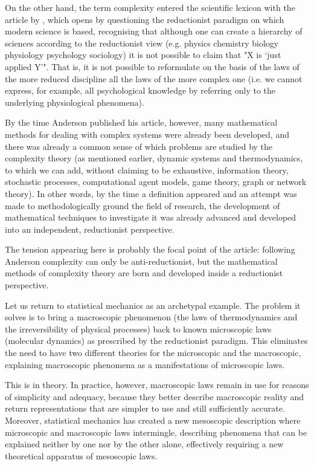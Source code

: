 \documentclass[a4paper, headings=standardclasses]{scrartcl}
\begin{document}
On the other hand, the term complexity entered the scientific lexicon with the \citeyear{anderson1972} article by \citeauthor{anderson1972}, which opens by questioning the reductionist paradigm on which modern science is based, recognising that although one can create a hierarchy of sciences according to the reductionist view (e.g. physics \textrightarrow{} chemistry \textrightarrow{} biology \textrightarrow{} physiology \textrightarrow{} psychology \textrightarrow{} sociology) it is not possible to claim that "X is `just applied Y'".
That is, it is not possible to reformulate on the basis of the laws of the more reduced discipline all the laws of the more complex one (i.e. we cannot express, for example, all psychological knowledge by referring only to the underlying physiological phenomena).

By the time Anderson published his article, however, many mathematical methods for dealing with complex systems were already been developed, and there was already a common sense of which problems are studied by the complexity theory (as mentioned earlier, dynamic systems and thermodynamics, to which we can add, without claiming to be exhaustive, information theory, stochastic processes, computational agent models, game theory, graph or network theory).
In other words, by the time a definition appeared and an attempt was made to methodologically ground the field of research, the development of mathematical techniques to investigate it was already advanced and developed into an independent, reductionist perspective.

The tension appearing here is probably the focal point of the article: following Anderson complexity can only be anti-reductionist, but the mathematical methods of complexity theory are born and developed inside a reductionist perspective.

Let us return to statistical mechanics as an archetypal example. The problem it solves is to bring a macroscopic phenomenon (the laws of thermodynamics and the irreversibility of physical processes) back to known microscopic laws (molecular dynamics) as prescribed by the reductionist paradigm.  This eliminates the need to have two different theories for the microscopic and the macroscopic, explaining macroscopic phenomena as a manifestations of microscopic laws.

This is in theory. In practice, however, macroscopic laws remain in use for reasons of simplicity and adequacy, because they better describe macroscopic reality and return representations that are simpler to use and still sufficiently accurate.
Moreover, statistical mechanics has created a new mesoscopic description where microscopic and macroscopic laws intermingle, describing phenomena that can be explained neither by one nor by the other alone, effectively requiring a new theoretical apparatus of mesoscopic laws.
\end{document}
